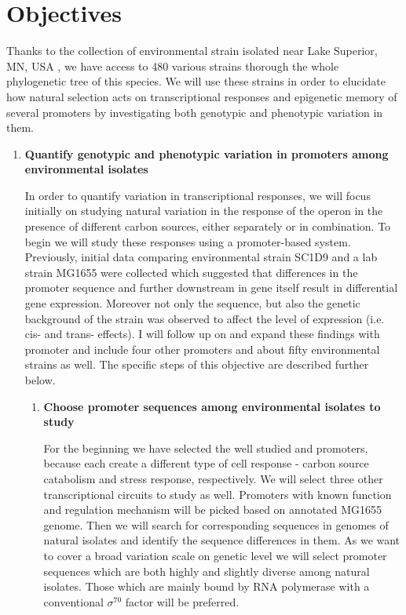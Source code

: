 \chapter*{Objectives}

\shorthandoff{-} 

Thanks to the collection of environmental  strain isolated near Lake Superior, MN, USA \cite{ishii2006presence}, we have access to 480 various strains thorough the whole phylogenetic tree of this species.
We will use these strains in order to elucidate how natural selection acts on transcriptional responses and epigenetic memory of several promoters by investigating both genotypic and phenotypic variation in them.

\begin{enumerate}[font=\bfseries]

	\item \textbf{Quantify genotypic and phenotypic variation in promoters among environmental  isolates}
	
	In order to quantify variation in transcriptional responses, we will focus initially on studying natural variation in the response of the  operon in the presence of different carbon sources, either separately or in combination.
	To begin we will study these responses using a promoter-based system.
	Previously, initial data comparing environmental strain SC1\textunderscore D9 and a lab strain MG1655 were collected which suggested that differences in the  promoter sequence and further downstream in  gene itself result in differential gene expression.
	Moreover not only the sequence, but also the genetic background of the strain was observed to affect the level of expression (i.e. cis- and trans- effects).
	I will follow up on and expand these findings with  promoter and include four other promoters and about fifty environmental  strains as well.
	The specific steps of this objective are described further below.

	\begin{enumerate}[font=\bfseries]
	
		\item \textbf{Choose promoter sequences among environmental  isolates to study}
		
		For the beginning we have selected the well studied  and  promoters, because each create a different type of cell response - carbon source catabolism and stress response, respectively.
		We will select three other transcriptional circuits to study as well.
		Promoters with known function and regulation mechanism will be picked based on annotated MG1655 genome.
		Then we will search for corresponding sequences in genomes of natural isolates and identify the sequence differences in them.
		As we want to cover a broad variation scale on genetic level we will select promoter sequences which are both highly and slightly diverse among natural isolates.
		Those which are mainly bound by RNA polymerase with a conventional $\sigma^{70}$ factor will be preferred.



\end{enumerate}
\end{enumerate}
